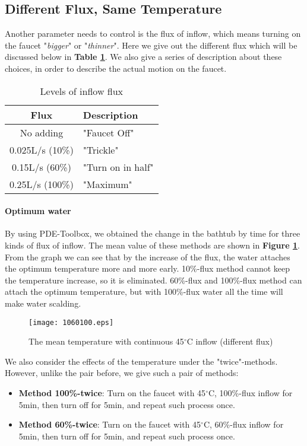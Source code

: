 \documentclass{HZNUMCM}
\begin{document}
\subsection{Different Flux, Same Temperature}
Another parameter needs to control is the flux of inflow, which means turning on the faucet
"\emph{bigger}" or "\emph{thinner}". Here we give out the different flux which will be discussed
below in \textbf{Table \ref{vl}}. We also give a series of description about these choices, in order
to describe the actual motion on the faucet.
\begin{table}[!htbp]
\begin{center}
\caption{Levels of inflow flux}
\begin{tabular}{cl}
    \toprule
    Flux&Description\\
    \midrule
    No adding&"Faucet Off"\\
    0.025L/s (10\%)&"Trickle"\\
    0.15L/s (60\%)&"Turn on in half"\\
    0.25L/s (100\%)&"Maximum"\\
    \bottomrule
\end{tabular}\label{vl}
\end{center}
\end{table}
\paragraph{Optimum water}
By using PDE-Toolbox, we obtained the change in the bathtub by time for three kinds of flux of
inflow. The mean value of these methods are shown in \textbf{Figure \ref{ll}}. From the graph we can
see that by the increase of the flux, the water attaches the optimum temperature more and more
early. 10\%-flux method cannot keep the temperature increase, so it is eliminated. 60\%-flux and
100\%-flux method can attach the optimum temperature, but with 100\%-flux water all the time will
make water scalding.
\begin{figure}[ht]
\small
\centering
\texttt{[image: 1060100.eps]}
\caption{The mean temperature with continuous 45$^\circ$C inflow (different flux)}\label{ll}
\end{figure}

We also consider the effects of the temperature under the "twice"-methods. However, unlike the pair
before, we give such a pair of methods:
\begin{itemize}
    \item \textbf{Method 100\%-twice}: Turn on the faucet with 45$^\circ$C, 100\%-flux inflow for
    5min, then turn off for 5min, and repeat such process once.
    \item \textbf{Method 60\%-twice}: Turn on the faucet with 45$^\circ$C, 60\%-flux inflow for
    5min, then turn off for 5min, and repeat such process once.
\end{itemize}
\end{document}
